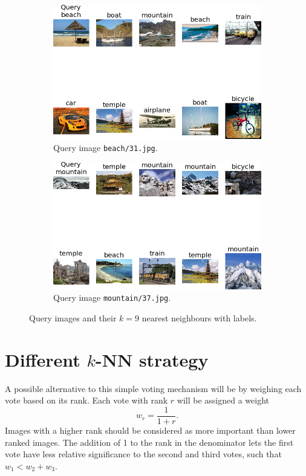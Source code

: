 \documentclass[a4paper,10pt,twoside]{article}
\begin{document}
\begin{figure}
  \begin{subfigure}{.47\textwidth}
    \centering
    \includegraphics[width=1\textwidth]{knn_beach31}
    \caption{Query image \texttt{beach/31.jpg}.}
  \end{subfigure}
  \hspace*{\fill}
  \begin{subfigure}{.47\textwidth}
    \centering
    \includegraphics[width=1\textwidth]{knn_mountain37}
    \caption{Query image \texttt{mountain/37.jpg}.}
  \end{subfigure}
  \caption{Query images and their $k=9$ nearest neighbours with labels.}
  \label{f:knns}
\end{figure}

\section{Different $k$-NN strategy}
A possible alternative to this simple voting mechanism will be by weighing each vote based on its rank.  Each vote with rank $r$ will be assigned a weight \[ w_r = \frac{1}{1+r}. \]  Images with a higher rank should be considered as more important than lower ranked images.  The addition of 1 to the rank in the denominator lets the first vote have less relative significance to the second and third votes, such that $w_1 < w_2 + w_3$.
\end{document}
